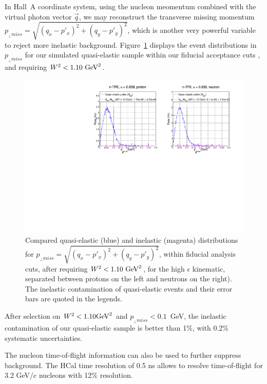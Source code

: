 \documentclass[11pt]{article}
\begin{document}
In Hall~A coordinate system, using the nucleon meomentum combined with the virtual photon vector $\vec{q}$, we may reconstruct the transverse missing momentum $p_{_{\perp} miss} = \sqrt{(q_{x}-p'_{x})^2+(q_{y}-p'_{y})^2}$, which is another very powerful variable to reject more inelastic background.
Figure~\ref{fig:pperp} displays the event distributions in $p_{_{\perp} miss}$ for our simulated quasi-elastic sample within our fiducial acceptance cuts%
, and requiring $W^2<1.10~{\rm GeV}^2$.
%
\begin{figure}[h]
  \centering
    \includegraphics[width=12cm]{gen-tpe_he_pperp_acc_real_new.pdf}
    \caption{Compared quasi-elastic (blue) and inelastic (magenta) distributions for $p_{_{\perp} miss} = \sqrt{(q_{x}-p'_{x})^2+(q_{y}-p'_{y})^2}$, within fiducial analysis cuts, after requiring $W^2<1.10~{\rm GeV}^2$, for the high $\epsilon$ kinematic, separated between protons on the left and neutrons on the right). The inelastic contamination of quasi-elastic events and their error bars are quoted in the legends.}
    \label{fig:pperp}
\end{figure}
%
After selection on $W^2 <1.10 {\rm GeV}^2$ and $p_{_{\perp} miss} <0.1$~GeV, the inelastic contamination of our quasi-elastic sample is better than 1\%, with 0.2\% systematic uncertainties.

The nucleon time-of-flight information can also be used to further suppress background. The HCal time resolution of 0.5 ns allows to resolve time-of-flight for 3.2 GeV/c nucleons with 12\% resolution.
\end{document}
